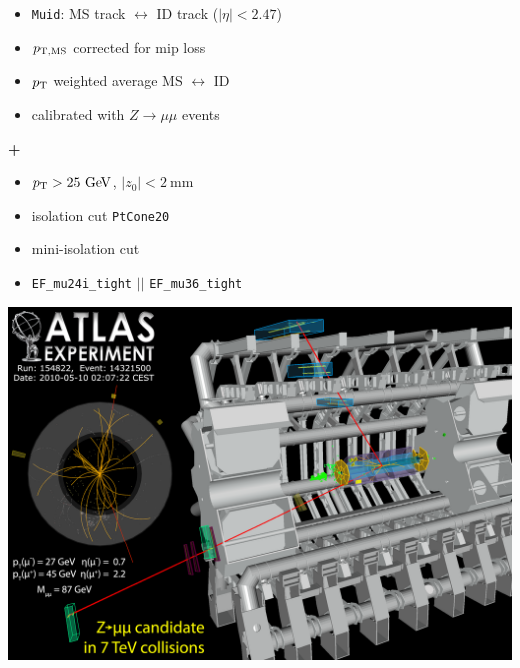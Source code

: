 \begin{frame}
\begin{minipage}{.5\textwidth}
\begin{itemize}
\item \texttt{Muid}: MS track $\leftrightarrow$ ID track ($|\eta|<2.47$)
\item $p_{\rm T,MS}$ corrected for mip loss
\item $p_{\rm T}$ weighted average MS $\leftrightarrow$ ID
\item calibrated with $Z\to \mu\mu$ events
\end{itemize}
{\cccolor \bfseries +}\\
\begin{itemize}
\item $\pt > 25\gev$, $|z_0|<2~$mm
\item isolation cut \texttt{PtCone20}
\item mini-isolation cut
\item \texttt{EF\_mu24i\_tight} $||$ \texttt{EF\_mu36\_tight}
\end{itemize}

\includegraphics[width=.78\textwidth,height=0.3\textheight]{pics/Zmumu}

\end{minipage}


\end{frame}



